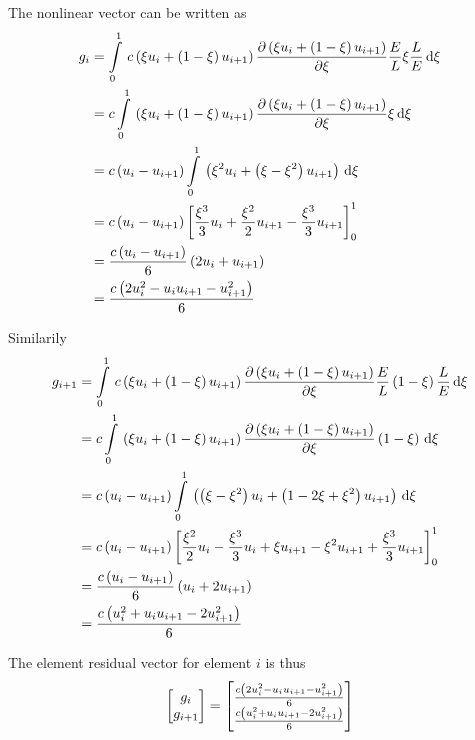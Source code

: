 The nonlinear vector can be written as
\begin{align}
  g_{i}&=\gint{0}{1}{c\pbrac{\xi u_{i}+\pbrac{1-\xi}u_{i+1}}\delby{\pbrac{\xi u_{i}+\pbrac{1-\xi}u_{i+1}}}{\xi}\dfrac{E}{L}\xi\dfrac{L}{E}}{\xi} \\
  &=c\gint{0}{1}{\pbrac{\xi u_{i}+\pbrac{1-\xi}u_{i+1}}\delby{\pbrac{\xi u_{i}+\pbrac{1-\xi}u_{i+1}}}{\xi}\xi}{\xi} \\
  &=c\pbrac{u_{i}-u_{i+1}}\gint{0}{1}{\pbrac{\xi^{2} u_{i}+\pbrac{\xi-\xi^{2}}u_{i+1}}}{\xi} \\
  &=c\pbrac{u_{i}-u_{i+1}}\sqbrac{\dfrac{\xi^{3}}{3}u_{i}+\dfrac{\xi^{2}}{2}u_{i+1} - \dfrac{\xi^{3}}{3}u_{i+1}}_{0}^{1}\\
  &=\dfrac{c\pbrac{u_{i}-u_{i+1}}}{6}\pbrac{2 u_{i}+u_{i+1}}\\
  &=\dfrac{c\pbrac{2 u_{i}^{2}-u_{i}u_{i+1}-u_{i+1}^{2}}}{6}
\end{align}

Similarily
\begin{align}
  g_{i+1}&=\gint{0}{1}{c\pbrac{\xi u_{i}+\pbrac{1-\xi}u_{i+1}}\delby{\pbrac{\xi u_{i}+\pbrac{1-\xi}u_{i+1}}}{\xi}\dfrac{E}{L}\pbrac{1-\xi}\dfrac{L}{E}}{\xi} \\
  &=c\gint{0}{1}{\pbrac{\xi u_{i}+\pbrac{1-\xi}u_{i+1}}\delby{\pbrac{\xi u_{i}+\pbrac{1-\xi}u_{i+1}}}{\xi}\pbrac{1-\xi}}{\xi} \\
  &=c\pbrac{u_{i}-u_{i+1}}\gint{0}{1}{\pbrac{\pbrac{\xi-\xi^{2}}u_{i}+\pbrac{1-2\xi+\xi^{2}}u_{i+1}}}{\xi} \\
  &=c\pbrac{u_{i}-u_{i+1}}\sqbrac{\dfrac{\xi^{2}}{2}u_{i}-\dfrac{\xi^{3}}{3}u_{i}+\xi u_{i+1}-\xi^{2}u_{i+1}+\dfrac{\xi^{3}}{3}u_{i+1}}_{0}^{1}\\
  &=\dfrac{c\pbrac{u_{i}-u_{i+1}}}{6}\pbrac{u_{i}+2u_{i+1}}\\
  &=\dfrac{c\pbrac{u_{i}^{2}+u_{i}u_{i+1}-2u_{i+1}^{2}}}{6}
\end{align}

The element residual vector for element $i$ is thus
\begin{equation}
  \begin{bmatrix}
    g_{i}  \\
    g_{i+1} 
  \end{bmatrix} = \begin{bmatrix}
    \frac{c\left( 2 u_{i}^{2}-u_{i}u_{i+1}-u_{i+1}^{2} \right)}{6} \\
    \frac{c\left( u_{i}^{2}+u_{i}u_{i+1}-2u_{i+1}^{2} \right)}{6}
   \end{bmatrix}
\end{equation}

